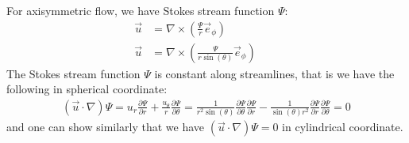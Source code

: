 \documentclass[11pt]{book}
\theoremstyle{break}
\theoremstyle{break}
\newcommand{\pd}{\partial}
\begin{document}
For axisymmetric flow, we have Stokes stream function $\Psi$:
\begin{align*}
\vec{u} &= \nabla \times \left( \frac{\Psi}{r} \vec{e}_{\phi}\right) \qquad \tag{in cylindrical coordinate}\\
\vec{u} &= \nabla \times \left( \frac{\Psi}{r\sin(\theta)} \vec{e}_{\phi}\right) \qquad \tag{in spherical coordinate}
\end{align*}
The Stokes stream function $\Psi$ is constant along streamlines, that is we have the following in spherical coordinate:
\begin{align*}
(\vec{u}\cdot \nabla ) \Psi= u_r \frac{\pd \Psi}{\pd r} + \frac{u_{\theta}}{r}\frac{\pd \Psi}{\pd \theta}=  \frac{1}{r^2\sin(\theta)}\frac{\pd \Psi}{\pd \theta} \frac{\pd \Psi}{\pd r} -\frac{1}{\sin(\theta)r^2} \frac{\pd \Psi}{\pd r}\frac{\pd \Psi}{\pd \theta} = 0
\end{align*}
and one can show similarly that we have $(\vec{u}\cdot \nabla ) \Psi = 0$ in cylindrical coordinate. \\
\end{document}

